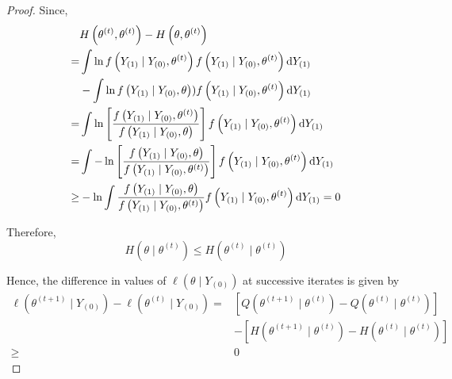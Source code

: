 \begin{proof}
	Since,
	\begin{equation}
		\begin{aligned}
			     & H\left(\theta^{(t)},\theta^{(t)}\right)-H\left(\theta,\theta^{(t)}\right)                                                                                                      \\
			=    & \int\ln f\left(Y_{(1)}\mid Y_{(0)},\theta^{(t)}\right)f\left(Y_{(1)}\mid Y_{(0)},\theta^{(t)}\right)\mathop{}\!\mathrm{d} Y_{(1)}                                                               \\
			     & -\int\ln f\left(Y_{(1)}\mid Y_{(0)},\theta\right))f\left(Y_{(1)}\mid Y_{(0)},\theta^{(t)}\right)\mathop{}\!\mathrm{d} Y_{(1)}                                                                   \\
			=    & \int\ln\left[\frac{f\left(Y_{(1)}\mid Y_{(0)},\theta^{(t)}\right)}{f\left(Y_{(1)}\mid Y_{(0)},\theta\right)}\right]f\left(Y_{(1)}\mid Y_{(0)},\theta^{(t)}\right)\mathop{}\!\mathrm{d} Y_{(1)}  \\
			=    & \int-\ln\left[\frac{f\left(Y_{(1)}\mid Y_{(0)},\theta\right)}{f\left(Y_{(1)}\mid Y_{(0)},\theta^{(t)}\right)}\right]f\left(Y_{(1)}\mid Y_{(0)},\theta^{(t)}\right)\mathop{}\!\mathrm{d} Y_{(1)} \\
			\geq & -\ln\int\frac{f\left(Y_{(1)}\mid Y_{(0)},\theta\right)}{f\left(Y_{(1)}\mid Y_{(0)},\theta^{(t)}\right)}f\left(Y_{(1)}\mid Y_{(0)},\theta^{(t)}\right)\mathop{}\!\mathrm{d} Y_{(1)}=0
		\end{aligned}
	\end{equation}

	Therefore,
	\begin{equation}
		H\left(\theta \mid \theta^{(t)}\right) \leq H\left(\theta^{(t)} \mid \theta^{(t)}\right)
	\end{equation}

	Hence, the difference in values of $\ell\left(\theta \mid Y_{(0)}\right)$ at successive iterates is given by
	\begin{equation}
		\begin{aligned}
			\ell\left(\theta^{(t+1)} \mid Y_{(0)}\right)-\ell\left(\theta^{(t)} \mid Y_{(0)}\right)= & \left[Q\left(\theta^{(t+1)} \mid \theta^{(t)}\right)-Q\left(\theta^{(t)} \mid \theta^{(t)}\right)\right]  \\
			                                                                                         & -\left[H\left(\theta^{(t+1)} \mid \theta^{(t)}\right)-H\left(\theta^{(t)} \mid \theta^{(t)}\right)\right] \\
			\geq                                                                                     & 0
		\end{aligned}
	\end{equation}
\end{proof}

